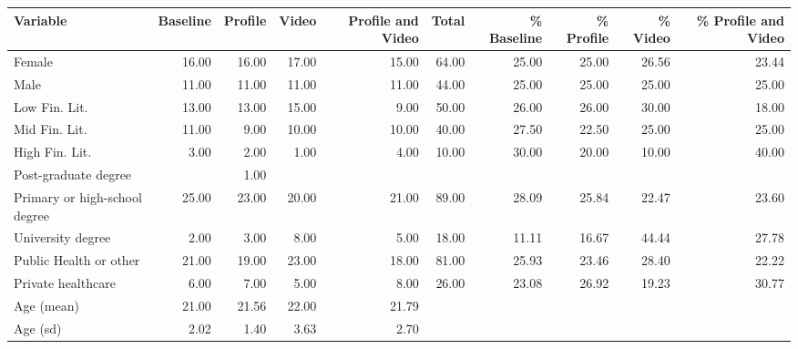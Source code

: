 \begin{tabular}{lrrrrrrrrr}
  \hline
Variable & Baseline & Profile & Video & Profile and Video & Total & \% Baseline & \% Profile & \% Video & \% Profile and Video \\ 
  \hline
Female & 16.00 & 16.00 & 17.00 & 15.00 & 64.00 & 25.00 & 25.00 & 26.56 & 23.44 \\ 
  Male & 11.00 & 11.00 & 11.00 & 11.00 & 44.00 & 25.00 & 25.00 & 25.00 & 25.00 \\ 
  Low Fin. Lit. & 13.00 & 13.00 & 15.00 & 9.00 & 50.00 & 26.00 & 26.00 & 30.00 & 18.00 \\ 
  Mid Fin. Lit. & 11.00 & 9.00 & 10.00 & 10.00 & 40.00 & 27.50 & 22.50 & 25.00 & 25.00 \\ 
  High Fin. Lit. & 3.00 & 2.00 & 1.00 & 4.00 & 10.00 & 30.00 & 20.00 & 10.00 & 40.00 \\ 
  Post-graduate degree &  & 1.00 &  &  &  &  &  &  &  \\ 
  Primary or high-school degree & 25.00 & 23.00 & 20.00 & 21.00 & 89.00 & 28.09 & 25.84 & 22.47 & 23.60 \\ 
  University degree & 2.00 & 3.00 & 8.00 & 5.00 & 18.00 & 11.11 & 16.67 & 44.44 & 27.78 \\ 
  Public Health or other & 21.00 & 19.00 & 23.00 & 18.00 & 81.00 & 25.93 & 23.46 & 28.40 & 22.22 \\ 
  Private healthcare & 6.00 & 7.00 & 5.00 & 8.00 & 26.00 & 23.08 & 26.92 & 19.23 & 30.77 \\ 
  Age (mean) & 21.00 & 21.56 & 22.00 & 21.79 &  &  &  &  &  \\ 
  Age (sd) & 2.02 & 1.40 & 3.63 & 2.70 &  &  &  &  &  \\ 
   \hline
\end{tabular}
